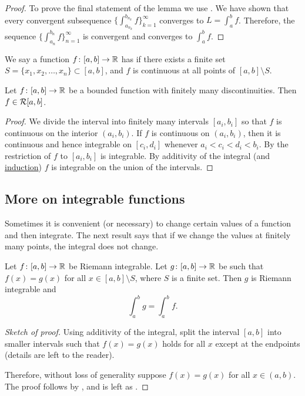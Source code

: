 \begin{proof}
To prove the final statement of the lemma we use 
.  We have shown that every convergent
subsequence
$\bigl\{ \int_{a_{n_k}}^{b_{n_k}} f \bigr\}_{k=1}^\infty$ converges to $L = \int_a^b f$.
Therefore, the sequence
$\bigl\{ \int_{a_n}^{b_n} f \bigr\}_{n=1}^\infty$ is convergent and converges to $\int_a^b f$.
\end{proof}

We say a function $f \colon [a,b] \to {\mathbb{R}}$ has \emph{} if there exists a finite set $S = \{ x_1, x_2, \ldots, x_n \}
\subset [a,b]$, and $f$ is continuous
at all points of $[a,b] \setminus S$.

\begin{thm}
Let $f \colon [a,b] \to {\mathbb{R}}$ be a bounded function with finitely
many discontinuities.  Then $f \in {\mathcal{R}}[a,b]$.
\end{thm}

\begin{proof}
We divide the interval into finitely many intervals $[a_i,b_i]$
so that $f$ is continuous
on the interior $(a_i,b_i)$.  If $f$ is continuous on $(a_i,b_i)$,
then it is continuous and hence integrable on $[c_i,d_i]$ whenever $a_i < c_i < d_i < b_i$.  By
the restriction
of $f$ to $[a_i,b_i]$ is integrable.  By additivity of the integral (and
\hyperref[induction:thm]{induction}) $f$ is integrable on the union of the intervals.
\end{proof}

\subsection{More on integrable functions}

Sometimes it is convenient (or necessary)
to change certain values of a function and
then integrate.  The next result says
that if we change the values at finitely
many points, the integral does not change.

\begin{prop}
Let $f \colon [a,b] \to {\mathbb{R}}$ be Riemann integrable.  Let $g \colon [a,b] \to
{\mathbb{R}}$ be such that $f(x) = g(x)$ for all $x \in [a,b] \setminus S$,
where $S$ is a finite set.
Then $g$ is Riemann integrable and
\begin{equation*}
\int_a^b g = \int_a^b f.
\end{equation*}
\end{prop}

\begin{proof}[Sketch of proof]
Using additivity of the integral, split the interval $[a,b]$ into
smaller intervals such that $f(x) = g(x)$ holds for all $x$ except at the
endpoints (details are left to the reader).

Therefore, without loss of generality suppose $f(x) = g(x)$ for
all $x \in (a,b)$.  The proof follows by ,
and is left as .
\end{proof}

